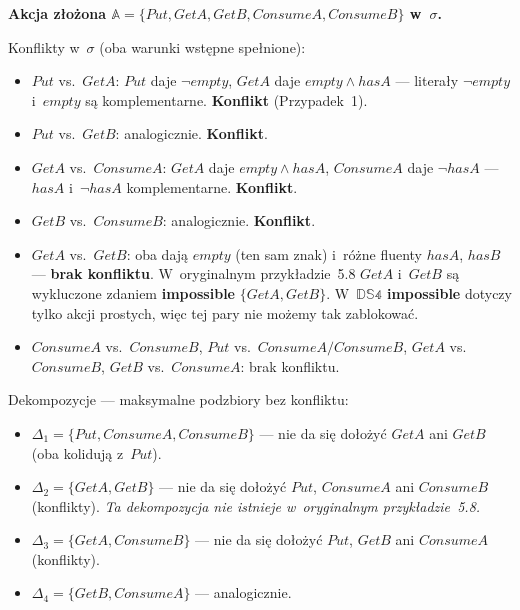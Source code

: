 \documentclass[11pt,a4paper]{article}
\newif\ifshowbib
\newcommand{\bibonly}[1]{\ifshowbib#1\fi}
\renewcommand{\cite}[2][]{\unskip}%
\newcommand{\impossible}{\textbf{impossible}}
\theoremstyle{definition}
\begin{document}
\medskip
\noindent\textbf{Akcja złożona $\mathbb{A} = \{\mathit{Put}, \mathit{GetA}, \mathit{GetB},
\mathit{ConsumeA}, \mathit{ConsumeB}\}$ w~$\sigma$.}

\smallskip\noindent
Konflikty w~$\sigma$ (oba warunki wstępne spełnione):
\begin{itemize}
  \item $\mathit{Put}$ vs.\ $\mathit{GetA}$:
        $\mathit{Put}$ daje $\neg\mathit{empty}$,
        $\mathit{GetA}$ daje $\mathit{empty} \land \mathit{hasA}$ ---
        literały $\neg\mathit{empty}$ i~$\mathit{empty}$ są komplementarne.
        \textbf{Konflikt} (Przypadek~1).
  \item $\mathit{Put}$ vs.\ $\mathit{GetB}$: analogicznie. \textbf{Konflikt}.
  \item $\mathit{GetA}$ vs.\ $\mathit{ConsumeA}$:
        $\mathit{GetA}$ daje $\mathit{empty} \land \mathit{hasA}$,
        $\mathit{ConsumeA}$ daje $\neg\mathit{hasA}$ ---
        $\mathit{hasA}$ i~$\neg\mathit{hasA}$ komplementarne.
        \textbf{Konflikt}.
  \item $\mathit{GetB}$ vs.\ $\mathit{ConsumeB}$: analogicznie. \textbf{Konflikt}.
  \item $\mathit{GetA}$ vs.\ $\mathit{GetB}$:
        oba dają $\mathit{empty}$ (ten sam znak) i~różne fluenty $\mathit{hasA}$,
        $\mathit{hasB}$ --- \textbf{brak konfliktu}.
        W~oryginalnym przykładzie~5.8\bibonly{ z~\cite{rw05}} $\mathit{GetA}$ i~$\mathit{GetB}$
        są wykluczone zdaniem \impossible{} $\{\mathit{GetA}, \mathit{GetB}\}$.
        W~$\mathbb{DS4}$ \impossible{} dotyczy tylko akcji prostych, więc
        tej pary nie możemy tak zablokować.
  \item $\mathit{ConsumeA}$ vs.\ $\mathit{ConsumeB}$,
        $\mathit{Put}$ vs.\ $\mathit{ConsumeA}/\mathit{ConsumeB}$,
        $\mathit{GetA}$ vs.\ $\mathit{ConsumeB}$,
        $\mathit{GetB}$ vs.\ $\mathit{ConsumeA}$: brak konfliktu.
\end{itemize}

\noindent Dekompozycje --- maksymalne podzbiory bez konfliktu:
\begin{itemize}
  \item $\Delta_1 = \{\mathit{Put}, \mathit{ConsumeA}, \mathit{ConsumeB}\}$ ---
        nie da się dołożyć $\mathit{GetA}$ ani $\mathit{GetB}$
        (oba kolidują z~$\mathit{Put}$).
  \item $\Delta_2 = \{\mathit{GetA}, \mathit{GetB}\}$ ---
        nie da się dołożyć $\mathit{Put}$, $\mathit{ConsumeA}$
        ani $\mathit{ConsumeB}$ (konflikty).
        \emph{Ta dekompozycja nie istnieje w~oryginalnym przykładzie~5.8.}
  \item $\Delta_3 = \{\mathit{GetA}, \mathit{ConsumeB}\}$ ---
        nie da się dołożyć $\mathit{Put}$, $\mathit{GetB}$
        ani $\mathit{ConsumeA}$ (konflikty).
  \item $\Delta_4 = \{\mathit{GetB}, \mathit{ConsumeA}\}$ --- analogicznie.
\end{itemize}
\end{document}
